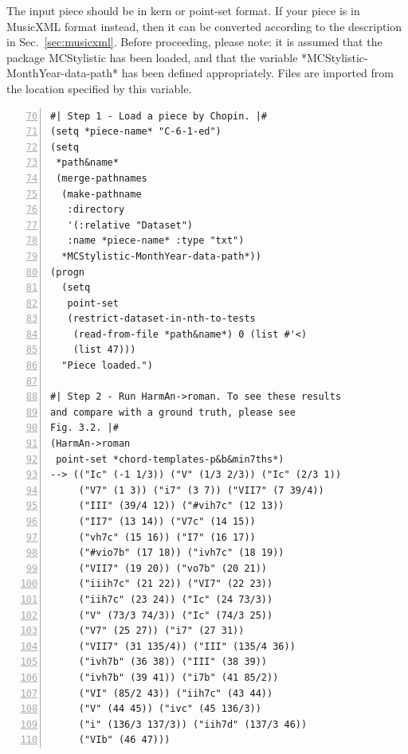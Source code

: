 The input piece should be in kern or point-set
format. If your piece is in MusicXML format instead,
then it can be converted according to the description
in Sec.~\ref{sec:musicxml}. Before proceeding, please
note: it is assumed that the package MCStylistic has
been loaded, and that the variable
*MCStylistic-MonthYear-data-path* has been defined
appropriately. Files are imported from the location
specified by this variable.

\begin{Verbatim}[frame=single,numbers=left,firstnumber=70]
#| Step 1 - Load a piece by Chopin. |#
(setq *piece-name* "C-6-1-ed")
(setq
 *path&name*
 (merge-pathnames
  (make-pathname
   :directory
   '(:relative "Dataset")
   :name *piece-name* :type "txt")
  *MCStylistic-MonthYear-data-path*))
(progn
  (setq
   point-set
   (restrict-dataset-in-nth-to-tests
    (read-from-file *path&name*) 0 (list #'<)
    (list 47)))
  "Piece loaded.")

#| Step 2 - Run HarmAn->roman. To see these results
and compare with a ground truth, please see 
Fig. 3.2. |#
(HarmAn->roman
 point-set *chord-templates-p&b&min7ths*)
--> (("Ic" (-1 1/3)) ("V" (1/3 2/3)) ("Ic" (2/3 1))
     ("V7" (1 3)) ("i7" (3 7)) ("VII7" (7 39/4))
     ("III" (39/4 12)) ("#vih7c" (12 13))
     ("II7" (13 14)) ("V7c" (14 15))
     ("vh7c" (15 16)) ("I7" (16 17))
     ("#vio7b" (17 18)) ("ivh7c" (18 19))
     ("VII7" (19 20)) ("vo7b" (20 21))
     ("iiih7c" (21 22)) ("VI7" (22 23))
     ("iih7c" (23 24)) ("Ic" (24 73/3))
     ("V" (73/3 74/3)) ("Ic" (74/3 25))
     ("V7" (25 27)) ("i7" (27 31))
     ("VII7" (31 135/4)) ("III" (135/4 36))
     ("ivh7b" (36 38)) ("III" (38 39))
     ("ivh7b" (39 41)) ("i7b" (41 85/2))
     ("VI" (85/2 43)) ("iih7c" (43 44))
     ("V" (44 45)) ("ivc" (45 136/3))
     ("i" (136/3 137/3)) ("iih7d" (137/3 46))
     ("VIb" (46 47)))
\end{Verbatim}

